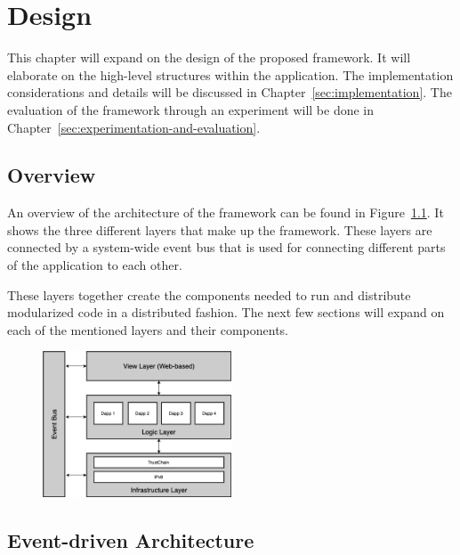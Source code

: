 \chapter{\label{sec:design}Design}


This chapter will expand on the design of the proposed framework. It will elaborate on the high-level structures within the application. The implementation considerations and details will be discussed in Chapter~\ref{sec:implementation}. The evaluation of the framework through an experiment will be  done in Chapter~\ref{sec:experimentation-and-evaluation}.

\section{Overview}

An overview of the architecture of the framework can be found in Figure~\ref{fig:architecture}. It shows the three different layers that make up the framework. These layers are connected by a system-wide event bus that is used for connecting different parts of the application to each other.

These layers together create the components needed to run and distribute modularized code in a distributed fashion. The next few sections will expand on each of the mentioned layers and their components.


\begin{figure}[h]
	\centering
	\includegraphics[width=0.5\textwidth]{images/architecture.png}
	\caption{\label{fig:architecture}}
\end{figure}

\section{Event-driven Architecture}

